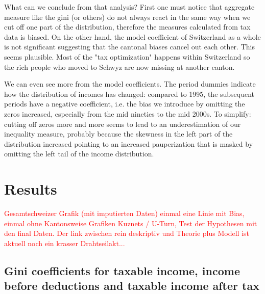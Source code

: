 \documentclass[twoside]{article}\usepackage[]{graphicx}\usepackage[]{color}
\makeatletter
\newenvironment{kframe}{%
 \def\at@end@of@kframe{}%
 \ifinner\ifhmode%
  \def\at@end@of@kframe{\end{minipage}}%
  \begin{minipage}{\columnwidth}%
 \fi\fi%
 \def\FrameCommand##1{\hskip\@totalleftmargin \hskip-\fboxsep
 \colorbox{shadecolor}{##1}\hskip-\fboxsep
     \hskip-\linewidth \hskip-\@totalleftmargin \hskip\columnwidth}%
 \MakeFramed {\advance\hsize-\width
   \@totalleftmargin\z@ \linewidth\hsize
   \@setminipage}}%
 {\par\unskip\endMakeFramed%
 \at@end@of@kframe}
\newenvironment{knitrout}{}{} %
\makeatother
\begin{document}
\begin{multicols}{2}
What can we conclude from that analysis? First one must notice that aggregate measure like the gini (or others) do not always react in the same way when we cut off one part of the distribution, therefore the measures calculated from tax data is biased. On the other hand, the model coefficient of Switzerland as a whole is not significant suggesting that the cantonal biases cancel out each other. This seems plausible. Most of the "tax optimization" happens within Switzerland so the rich people who moved to Schwyz are now missing at another canton.

We can even see more from the model coefficients. The period dummies indicate how the distribution of incomes has changed: compared to 1995, the subsequent periods have a negative coefficient, i.e. the bias we introduce by omitting the zeros increased, especially from the mid nineties to the mid 2000s. To simplify: cutting off zeros more and more seems to lead to an underestimation of our inequality measure, probably because the skewness in the left part of the distribution increased pointing to an increased pauperization that is masked by omitting the left tail of the income distribution.







\section{Results}

\textcolor{red}{Gesamtschweizer Grafik (mit imputierten Daten) einmal eine Linie mit Bias, einmal ohne
Kantonsweise Grafiken
Kuznets / U-Turn, Test der Hypothesen mit den final Daten. Der link zwischen rein deskriptiv  und Theorie plus Modell ist aktuell noch ein krasser Drahtseilakt...}

\subsection{Gini coefficients for taxable income, income before deductions and taxable income after tax}




\begin{knitrout}
\color{fgcolor}\begin{kframe}



\end{kframe}
\end{knitrout}
\end{multicols}
\end{document}
